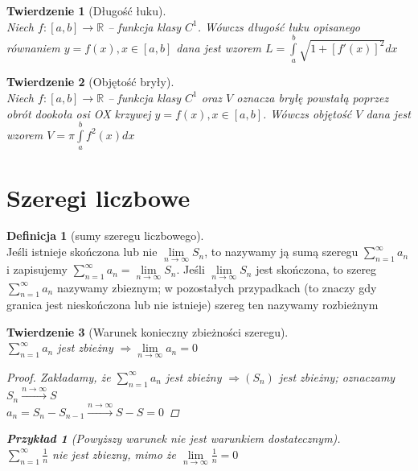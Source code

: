 \documentclass[12pt,a4paper]{article}
\newtheorem{tw}{Twierdzenie}
\newtheorem{przyklad}{Przykład}
\theoremstyle{definition}
\newtheorem{df}{Definicja}
\begin{document}
\begin{tw}[Długość łuku]~\\
Niech $f: [a,b] \to \mathbb{R}$ -- funkcja klasy $C^1$. Wówczs długość łuku opisanego równaniem $y=f(x), x\in [a,b]$ dana jest wzorem $L = \int\limits_a^b \sqrt{1 + \left[f'(x)\right]^2}dx$
\end{tw}

\begin{tw}[Objętość bryły]~\\
Niech $f: [a,b] \to \mathbb{R}$ -- funkcja klasy $C^1$ oraz $V$ oznacza bryłę powstałą poprzez obrót
 dookoła osi OX krzywej $y = f(x), x\in [a,b]$. Wówczs objętość $V$ dana jest wzorem $V = \pi\int\limits_a^b f^2(x)dx$
\end{tw}


\section{Szeregi liczbowe}

\begin{df}[sumy szeregu liczbowego]~\\
Jeśli istnieje skończona lub nie $\lim\limits_{n\to\infty}S_n$, to nazywamy ją sumą szeregu $\sum\limits_{n=1}^\infty a_n$ i zapisujemy $\sum\limits_{n=1}^\infty a_n=\lim\limits_{n\to\infty}S_n$.
Jeśli $\lim\limits_{n\to\infty}S_n$ jest skończona, to szereg $\sum\limits_{n=1}^\infty a_n$ nazywamy zbieznym; w pozostałych przypadkach (to znaczy gdy granica jest nieskończona lub nie istnieje) szereg ten nazywamy rozbieżnym
\end{df}

\begin{tw}[Warunek konieczny zbieżności szeregu]~\\
$\sum\limits_{n=1}^\infty a_n$ jest zbieżny $\Rightarrow \lim\limits_{n\to\infty}a_n = 0$
\begin{proof}
Zakładamy, że $\sum\limits_{n=1}^\infty a_n$ jest zbieżny $\Rightarrow (S_n)$ jest zbieżny; oznaczamy 
$S_n \xrightarrow{n\to\infty} S$\\
$a_n = S_n - S_{n-1} \xrightarrow{n\to\infty} S - S = 0$ 
\end{proof}
\begin{przyklad}[Powyższy warunek nie jest warunkiem dostatecznym]~\\
$\sum\limits_{n=1}^\infty \frac{1}{n}$ nie jest zbiezny, mimo że $\lim\limits_{n\to\infty} \frac{1}{n} = 0$
\end{przyklad}
\end{tw}
\end{document}
